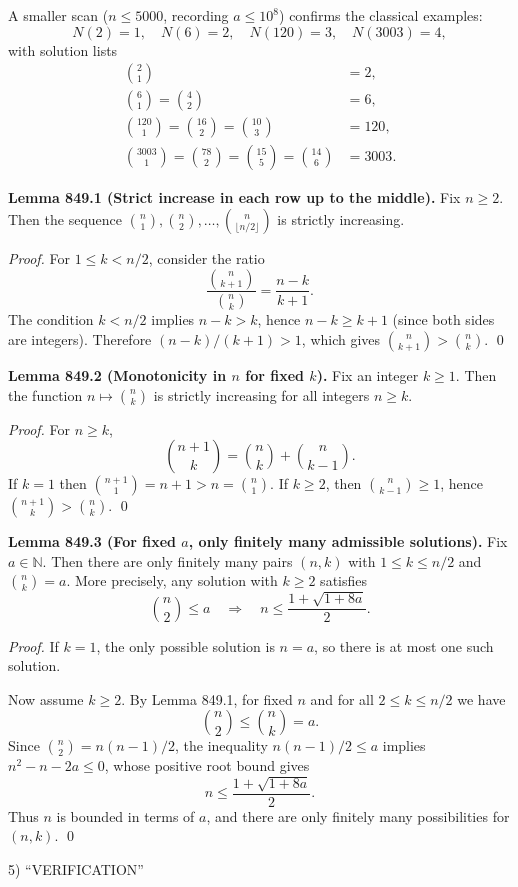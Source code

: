 A smaller scan ($n\le 5000$, recording $a\le 10^8$) confirms the classical examples:
\[
N(2)=1,\quad N(6)=2,\quad N(120)=3,\quad N(3003)=4,
\]
with solution lists
\[
\begin{aligned}
\binom{2}{1}&=2,\\
\binom{6}{1}=\binom{4}{2}&=6,\\
\binom{120}{1}=\binom{16}{2}=\binom{10}{3}&=120,\\
\binom{3003}{1}=\binom{78}{2}=\binom{15}{5}=\binom{14}{6}&=3003.
\end{aligned}
\]

\textbf{Lemma 849.1 (Strict increase in each row up to the middle).}
Fix $n\ge 2$. Then the sequence $\binom{n}{1},\binom{n}{2},\dots,\binom{n}{\lfloor n/2\rfloor}$ is strictly increasing.

\emph{Proof.}
For $1\le k< n/2$, consider the ratio
\[
\frac{\binom{n}{k+1}}{\binom{n}{k}}=\frac{n-k}{k+1}.
\]
The condition $k< n/2$ implies $n-k>k$, hence $n-k\ge k+1$ (since both sides are integers). Therefore $(n-k)/(k+1)>1$, which gives $\binom{n}{k+1}>\binom{n}{k}$. \qed

\textbf{Lemma 849.2 (Monotonicity in $n$ for fixed $k$).}
Fix an integer $k\ge 1$. Then the function $n\mapsto \binom{n}{k}$ is strictly increasing for all integers $n\ge k$.

\emph{Proof.}
For $n\ge k$,
\[
\binom{n+1}{k}=\binom{n}{k}+\binom{n}{k-1}.
\]
If $k=1$ then $\binom{n+1}{1}=n+1>n=\binom{n}{1}$. If $k\ge 2$, then $\binom{n}{k-1}\ge 1$, hence $\binom{n+1}{k}>\binom{n}{k}$. \qed

\textbf{Lemma 849.3 (For fixed $a$, only finitely many admissible solutions).}
Fix $a\in\mathbb{N}$. Then there are only finitely many pairs $(n,k)$ with $1\le k\le n/2$ and $\binom{n}{k}=a$. More precisely, any solution with $k\ge 2$ satisfies
\[
\binom{n}{2}\le a \quad\Rightarrow\quad n\le \frac{1+\sqrt{1+8a}}{2}.
\]

\emph{Proof.}
If $k=1$, the only possible solution is $n=a$, so there is at most one such solution.

Now assume $k\ge 2$. By Lemma 849.1, for fixed $n$ and for all $2\le k\le n/2$ we have
\[
\binom{n}{2}\le \binom{n}{k}=a.
\]
Since $\binom{n}{2}=n(n-1)/2$, the inequality $n(n-1)/2\le a$ implies $n^2-n-2a\le 0$, whose positive root bound gives
\[
n\le \frac{1+\sqrt{1+8a}}{2}.
\]
Thus $n$ is bounded in terms of $a$, and there are only finitely many possibilities for $(n,k)$. \qed

5) “VERIFICATION”

